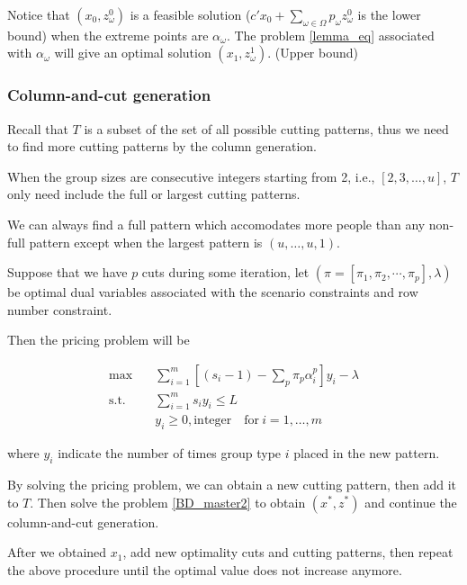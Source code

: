 Notice that $(x_0, z_{\omega}^{0})$ is a feasible solution ($c{'} x_0 + \sum_{\omega \in \Omega} p_{\omega} z_{\omega}^{0}$ is the lower bound) when the extreme points are $\alpha_{\omega}$. The problem \eqref{lemma_eq} associated with $\alpha_{\omega}$ will give an optimal solution $(x_1, z_{\omega}^{1})$. (Upper bound)

\subsubsection{Column-and-cut generation}

Recall that $T$ is a subset of the set of all possible cutting patterns, thus we need to find more cutting patterns by the column generation.

\begin{lem}\label{full_cutting_pattern}
When the group sizes are consecutive integers starting from 2, i.e., $[2,3,\ldots,u]$, $T$ only need include the full or largest cutting patterns.
\end{lem}

We can always find a full pattern which accomodates more people than any non-full pattern except when the largest pattern is $(u, \ldots, u, 1)$.

Suppose that we have $p$ cuts during some iteration, let $(\pi=\left[\pi_{1}, \pi_{2},\cdots,\pi_{p}\right],\lambda)$ be optimal dual variables associated with the scenario constraints and row number constraint.

Then the pricing problem will be

\begin{equation}\label{add_cutting_pattern}
  \begin{aligned}
  \mbox{max}\quad & \sum_{i=1}^m \left[(s_i-1) -\sum_{p}\pi_{p}\alpha_{i}^{p} \right] y_{i} - \lambda \\
  \mbox{s.t.} \quad & \sum_{i=1}^m s_i y_i \leq L  \\
  & y_i \geq 0, \mbox{integer}\quad \mbox{for}~ i=1,\ldots,m
\end{aligned}
\end{equation}

where $y_i$ indicate the number of times group type $i$ placed in the new pattern.

By solving the pricing problem, we can obtain a new cutting pattern, then add it to $T$. Then solve the problem \eqref{BD_master2} to obtain $(x^{*}, z^{*})$ and continue the column-and-cut generation.

After we obtained $x_1$, add new optimality cuts and cutting patterns, then repeat the above procedure until the optimal value does not increase anymore.


